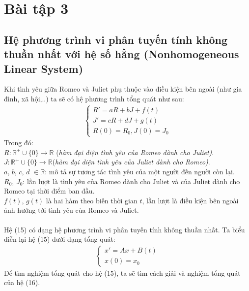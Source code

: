 \section{Bài tập 3}
\subsection{Hệ phương trình vi phân tuyến tính không thuần nhất với hệ số hằng (Nonhomogeneous Linear System)}
Khi tình yêu giữa Romeo và Juliet phụ thuộc vào điều kiện bên ngoài (như gia đình, xã hội,..) ta sẽ có hệ phương trình tổng quát như sau:
\begin{align}
    \begin{cases}
        R'=aR+bJ+f(t)\\
        J'=cR+dJ+g(t)\\
        R(0)=R_0, J(0)=J_0
    \end{cases}
\end{align}
Trong đó:\\
$R:\mathbb{R^+}\cup\{0\}\to \mathbb{R}$ (\textit{hàm đại diện tình yêu của Romeo dành cho Juliet)}.\\
$J:\mathbb{R^+}\cup\{0\}\to \mathbb{R}$(\textit{hàm đại diện tình yêu của Juliet dành cho Romeo)}.\\
$a$, $b$, $c$, $d$ $\in\mathbb{R}$: mô tả sự tương tác tình yêu của một người đến người còn lại.\\
$R_0$, $J_0$: lần lượt là tình yêu của Romeo dành cho Juliet và của Juliet dành cho Romeo tại thời điểm ban đầu.\\
$f(t)$, $g(t)$ là hai hàm theo biến thời gian $t$, lần lượt là điều kiện bên ngoài ảnh hưởng tới tình yêu của Romeo và Juliet.\\\\
Hệ (15) có dạng hệ phương trình vi phân tuyến tính không thuần nhất. Ta biểu diễn lại hệ (15) dưới dạng tổng quát:\\
\begin{align}
    \begin{cases}
        x'=Ax+B(t)\\
        x(0)=x_0
    \end{cases}
\end{align}
Để tìm nghiệm tổng quát cho hệ (15), ta sẽ tìm cách giải và nghiệm tổng quát của hệ (16).\\
